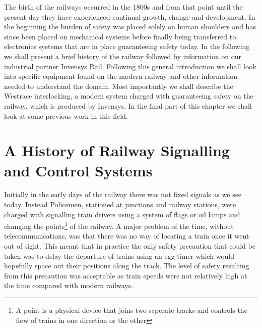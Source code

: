 
The birth of the railways occurred in the 1800s and from that point until the present day they have experienced continual growth, change and development. In the beginning the burden of safety was placed solely on human shoulders and has since been placed on mechanical systems before finally being transferred to electronics systems that are in place guaranteeing safety today. In the following we shall present a brief history of the railway followed by information on our industrial partner Invensys Rail.  Following this general introduction we shall look into specific equipment found on the modern railway and other information needed to understand the domain. Most importantly we shall describe the Westrace interlocking, a modern system charged with guaranteeing safety on the railway, which is produced by Invensys. In the final part of this chapter we shall look at some previous work in this field.


\begin{comment}
From their birth in the 1800s to the present day, the railway and its control
systems have seen many advances. Its control and safety has gone from being a
completely manual human based system, to a mechanical system and finally to the electronic
system we see today. We will now look at a brief history of the railway
followed by information on our industrial partner Invensys Rail. We then look
more closely at modern railways and the equipment which constitutes
them. We also study
Westrace interlocking which is produced by Invensys and the
ladder logic programs which run on it. Finally, we look at some previous work
in this field.
\end{comment}

\section{ A History of Railway Signalling and Control Systems}
Initially in the early days of the railway there was not fixed signals as we see today. Instead Policemen, stationed at junctions and railway stations, were charged with signalling train drivers using a system of flags or oil lamps and changing the points\footnote{A point is a physical device that joins two seperate tracks and controls the flow of trains in one direction or the other} of the railway. A major problem of the time, without telecommunications, was that there was no way of locating a train once it went out of sight. This meant that in practice the only safety precaution that could be taken was to delay the departure of trains using an egg timer which would hopefully space out their positions along the track. The level of safety resulting from this precaution was acceptable as train speeds were not relatively high at the time compared with modern railways.


